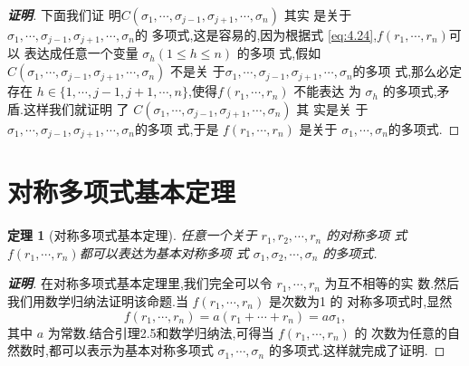 \documentclass[a4paper]{article}
\newtheorem{theorem}{定理}[section]
\begin{document}
\begin{proof}[\bf{证明}]
  下面我们证
  明$C(\sigma_1,\cdots,\sigma_{j-1},\sigma_{j+1},\cdots,\sigma_n)$ 其实
  是关于 $\sigma_1,\cdots,\sigma_{j-1},\sigma_{j+1},\cdots,\sigma_n$的
  多项式,这是容易的,因为根据式 \eqref{eq:4.24},$f(r_1,\cdots,r_n)$可以
  表达成任意一个变量 $\sigma_h(1\leq h\leq n)$ 的多项
  式,假如
  $C(\sigma_1,\cdots,\sigma_{j-1},\sigma_{j+1},\cdots,\sigma_n)$ 不是关
  于$\sigma_1,\cdots,\sigma_{j-1},\sigma_{j+1},\cdots,\sigma_n$的多项
  式,那么必定存在 $h\in
  \{1,\cdots,j-1,j+1,\cdots,n\}$,使得$f(r_1,\cdots,r_n)$ 不能表达
  为 $\sigma_h$ 的多项式,矛盾.这样我们就证明
  了 $C(\sigma_1,\cdots,\sigma_{j-1},\sigma_{j+1},\cdots,\sigma_n)$ 其
  实是关
  于 $\sigma_1,\cdots,\sigma_{j-1},\sigma_{j+1},\cdots,\sigma_n$的多项
  式,于是 $f(r_1,\cdots,r_n)$ 是关于 $\sigma_1,\cdots,\sigma_n$的多项式.
\end{proof}
\section{对称多项式基本定理}

      \begin{theorem}[对称多项式基本定理]
        任意一个关于 $r_1,r_2,\cdots,r_n$ 的对称多项
        式 $f(r_1,\cdots,r_n)$都可以表达为基本对称多项
        式 $\sigma_1,\sigma_2,\cdots,\sigma_n$ 的多项式.
      \end{theorem}

\begin{proof}[\bf{证明}]
在对称多项式基本定理里,我们完全可以令 $r_1,\cdots,r_n$ 为互不相等的实
数.然后我们用数学归纳法证明该命题.当 $f(r_1,\cdots,r_n)$ 是次数为1 的
对称多项式时,显然 
$$
f(r_1,\cdots,r_n)=a(r_1+\cdots+r_n)=a\sigma_1,
$$
其中 $a$ 为常数.结合引理2.5和数学归纳法,可得当 $f(r_1,\cdots,r_n)$ 的
次数为任意的自然数时,都可以表示为基本对称多项式
$\sigma_1,\cdots,\sigma_n$ 的多项式.这样就完成了证明.
\end{proof}
\end{document}
